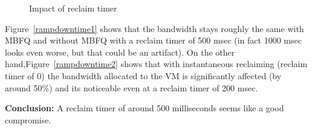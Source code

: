 \begin{figure}[h]
\centering
{}
\vspace{-1em}
\caption{Impact of reclaim timer}
\vspace{-1em}
\label{fig:reclaim}
\end{figure}

Figure~\ref{rampdowntime1} shows that the bandwidth stays roughly the same with
MBFQ and without MBFQ with a reclaim timer of 500 msec (in fact 1000 msec looks
even worse, but that could be an artifact).   On the other
hand,Figure~\ref{rampdowntime2} shows that with instantaneous reclaiming
(reclaim timer of 0) the bandwidth allocated to the VM is significantly affected
(by around 50\%) and its noticeable even at a reclaim timer of 200 msec.

{\bf Conclusion:}  A reclaim timer of around 500 milliseconds seems like a good
compromise. 
